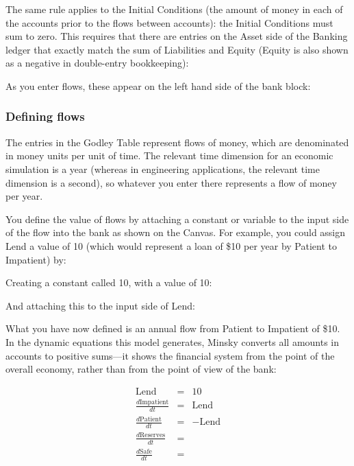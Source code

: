 The same rule applies to the Initial Conditions (the amount of money
in each of the accounts prior to the flows between accounts): the
Initial Conditions must sum to zero. This requires that there are
entries on the Asset side of the Banking ledger that exactly match the
sum of Liabilities and Equity (Equity is also shown as a negative in
double-entry bookkeeping): 


As you enter flows, these appear on the left hand side of the bank block:


\subsubsection{Defining flows}

The entries in the Godley Table represent flows of money, which are
denominated in money units per unit of time. The relevant time
dimension for an economic simulation is a year (whereas in engineering
applications, the relevant time dimension is a second), so whatever
you enter there represents a flow of money per year.


You define the value of flows by attaching a constant or variable to
the input side of the flow into the bank as shown on the Canvas. For
example, you could assign Lend a value of 10 (which would represent a
loan of \$10 per year by Patient to Impatient) by:



Creating a constant called 10, with a value of 10:


And attaching this to the input side of Lend:



What you have now defined is an annual flow from Patient to Impatient
of \$10. In the dynamic equations this model generates, Minsky
converts all amounts in accounts to positive sums---it shows the
financial system from the point of the overall economy, rather than
from the point of view of the bank:

\begin{eqnarray*}
\mathrm{Lend}&=&10\\
\frac{d\mathrm{Impatient}}{dt}&=&\mathrm{Lend}\\
\frac{d\mathrm{Patient}}{dt}&=&-\mathrm{Lend}\\
\frac{d\mathrm{Reserves}}{dt}&=&\\
\frac{d\mathrm{Safe}}{dt}&=&
\end{eqnarray*}



